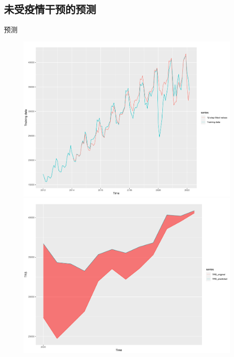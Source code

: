 \documentclass[10pt]{beamer}
\newcommand{\xiaowuhao}{\fontsize{9pt}{\baselineskip}\selectfont} %
\begin{document}
\subsection{未受疫情干预的预测}

\begin{frame}{预测}
  \begin{figure}[htbp] %
    \centering %
    \begin{minipage}[t]{0.48\textwidth}
      \centering
      \includegraphics[width=1\textwidth]{figures/training_forecast.pdf} %
      \caption{\xiaowuhao{ARIMA模型得到的12步拟合值}} %
      \label{traning_forecast} %
    \end{minipage}
    \begin{minipage}[t]{0.48\textwidth}
      \centering %
      \includegraphics[width=1\textwidth]{figures/trs_2020.pdf} %
      \caption{\xiaowuhao{2020年社会消费品零售总额的损失}} %
      \label{trs_2020} %
    \end{minipage}
  \end{figure} 
\end{frame}
\end{document}

